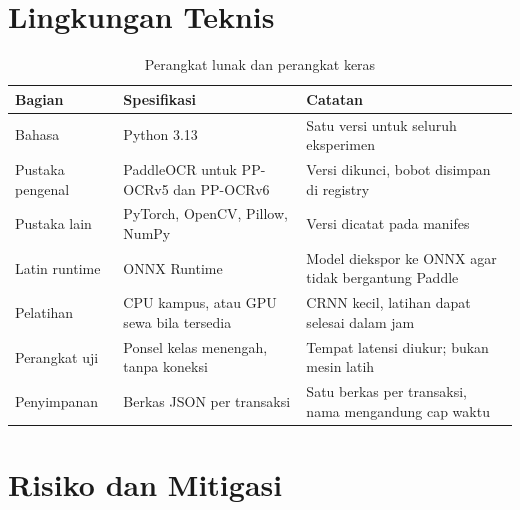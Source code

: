 \documentclass[12pt,a4paper,oneside]{report}
\begin{document}
\chapter{Lingkungan Teknis}

\begin{table}[H]
\caption{Perangkat lunak dan perangkat keras}
\label{tab:lingkungan}
\begin{tabularx}{\textwidth}{@{}L{2.8cm} L{5.2cm} X@{}}
\toprule
\textbf{Bagian} & \textbf{Spesifikasi} & \textbf{Catatan} \\
\midrule
Bahasa & Python 3.13 & Satu versi untuk seluruh eksperimen \\
Pustaka pengenal & PaddleOCR untuk PP-OCRv5 dan PP-OCRv6 & Versi dikunci, bobot disimpan di registry \\
Pustaka lain & PyTorch, OpenCV, Pillow, NumPy & Versi dicatat pada manifes \\
Latin runtime & ONNX Runtime & Model diekspor ke ONNX agar tidak bergantung Paddle \\
Pelatihan & CPU kampus, atau GPU sewa bila tersedia & CRNN kecil, latihan dapat selesai dalam jam \\
Perangkat uji & Ponsel kelas menengah, tanpa koneksi & Tempat latensi diukur; bukan mesin latih \\
Penyimpanan & Berkas JSON per transaksi & Satu berkas per transaksi, nama mengandung cap waktu \\
\bottomrule
\end{tabularx}
\end{table}

\chapter{Risiko dan Mitigasi}
\end{document}
